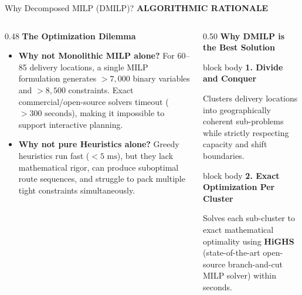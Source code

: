 \documentclass[aspectratio=169,10pt]{beamer}
\newcommand{\sectiontag}[1]{%
    {\scriptsize\bfseries\color{Accent}\MakeUppercase{#1}}\par\vspace{0.08cm}
}
\begin{document}
\begin{frame}{Why Decomposed MILP (DMILP)?}
\sectiontag{Algorithmic Rationale}

\vspace{-0.15cm}

\begin{columns}[T,totalwidth=\textwidth]

    \begin{column}{0.48\textwidth}
        \textbf{\color{Primary}\small The Optimization Dilemma}
        \vspace{0.05cm}
        \footnotesize
        \begin{itemize}
            \setlength{\itemsep}{4pt}
            \item \textbf{Why not Monolithic MILP alone?}
            For 60--85 delivery locations, a single MILP formulation generates $>7,000$ binary variables and $>8,500$ constraints. Exact commercial/open-source solvers timeout ($>300\text{ seconds}$), making it impossible to support interactive planning.
            \item \textbf{Why not pure Heuristics alone?}
            Greedy heuristics run fast ($<5\text{ ms}$), but they lack mathematical rigor, can produce suboptimal route sequences, and struggle to pack multiple tight constraints simultaneously.
        \end{itemize}
    \end{column}

    \begin{column}{0.50\textwidth}
        \textbf{\color{Primary}\small Why DMILP is the Best Solution}
        \vspace{0.05cm}

        \begin{beamercolorbox}[rounded=true,shadow=false,wd=\linewidth,sep=4pt]{block body}
            {\bfseries\color{Primary}\scriptsize 1. Divide and Conquer}\par\vspace{0.02cm}
            \scriptsize
            Clusters delivery locations into geographically coherent sub-problems while strictly respecting capacity and shift boundaries.
        \end{beamercolorbox}

        \vspace{0.12cm}

        \begin{beamercolorbox}[rounded=true,shadow=false,wd=\linewidth,sep=4pt]{block body}
            {\bfseries\color{Accent}\scriptsize 2. Exact Optimization Per Cluster}\par\vspace{0.02cm}
            \scriptsize
                        Solves each sub-cluster to exact mathematical optimality using \textbf{HiGHS} (state-of-the-art open-source branch-and-cut MILP solver) within seconds.


\end{beamercolorbox}
\end{column}
\end{columns}
\end{frame}
\end{document}
